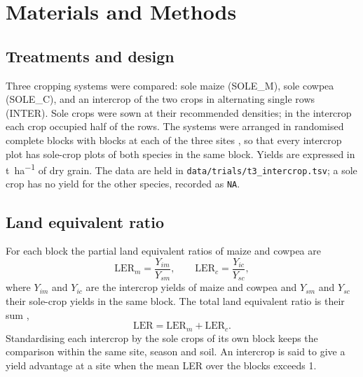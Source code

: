 \section{Materials and Methods}

\subsection{Treatments and design}
Three cropping systems were compared: sole maize (SOLE\_M), sole cowpea
(SOLE\_C), and an intercrop of the two crops in alternating single rows
(INTER). Sole crops were sown at their recommended densities; in the intercrop
each crop occupied half of the rows. The systems were arranged in randomised
complete blocks with  blocks at each of the three sites
\parencite{gomez1984}, so that every intercrop plot has sole-crop plots of both
species in the same block. Yields are expressed in \si{\tonne\per\hectare} of
dry grain. The data are held in \texttt{data/trials/t3\_intercrop.tsv}; a sole
crop has no yield for the other species, recorded as \texttt{NA}.

\subsection{Land equivalent ratio}
For each block the partial land equivalent ratios of maize and cowpea are
\begin{equation}
  \mathrm{LER}_m = \frac{Y_{im}}{Y_{sm}}, \qquad
  \mathrm{LER}_c = \frac{Y_{ic}}{Y_{sc}},
  \label{eq:partialler}
\end{equation}
where $Y_{im}$ and $Y_{ic}$ are the intercrop yields of maize and cowpea and
$Y_{sm}$ and $Y_{sc}$ their sole-crop yields in the same block. The total land
equivalent ratio is their sum \parencite{mead1980},
\begin{equation}
  \mathrm{LER} = \mathrm{LER}_m + \mathrm{LER}_c .
  \label{eq:ler}
\end{equation}
Standardising each intercrop by the sole crops of its own block keeps the
comparison within the same site, season and soil. An intercrop is said to give
a yield advantage at a site when the mean LER over the  blocks exceeds 1.
